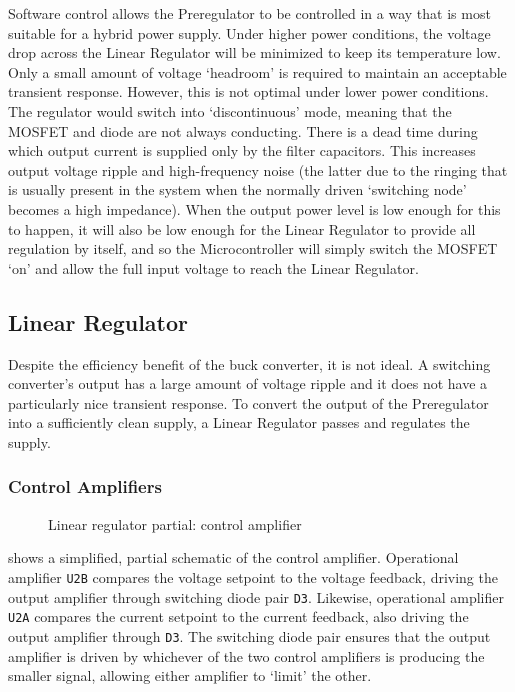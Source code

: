 \documentclass[a4paper,twocolumn,10pt,openany,oneside,final,fleqn]{memoir}
\newcommand{\rd}[1]{\texttt{#1}}
\newcommand{\xcircuit}[1]{ \centering \textsf{  } }
\begin{document}
Software control allows the Preregulator to be controlled in a way that is most suitable
for a hybrid power supply. Under higher power conditions, the voltage drop across the Linear
Regulator will be minimized to keep its temperature low. Only a small amount of voltage
`headroom' is required to maintain an acceptable transient response. However, this is not
optimal under lower power conditions. The regulator would switch into `discontinuous' mode,
meaning that the MOSFET and diode are not always conducting. There is a dead time during
which output current is supplied only by the filter capacitors. This increases output voltage
ripple and high-frequency noise (the latter due to the ringing that is usually present in
the system when the normally driven `switching node' becomes a high impedance). When the
output power level is low enough for this to happen, it will also be low enough for the
Linear Regulator to provide all regulation by itself, and so the Microcontroller will
simply switch the MOSFET `on' and allow the full input voltage to reach the Linear Regulator.

\subsection{Linear Regulator}

Despite the efficiency benefit of the buck converter, it is not ideal. A switching converter's
output has a large amount of voltage ripple and it does not have a particularly nice transient
response. To convert the output of the Preregulator into a sufficiently clean supply, a Linear
Regulator passes and regulates the supply.

\subsubsection{Control Amplifiers}

\begin{figure}
\xcircuit{control358}
\caption{Linear regulator partial: control amplifier}
\label{fig:controlamp}
\end{figure}

 shows a simplified, partial schematic of the control amplifier.
Operational amplifier \rd{U2B} compares the voltage setpoint to the voltage feedback,
driving the output amplifier through switching diode pair \rd{D3}. Likewise, operational
amplifier \rd{U2A} compares the current setpoint to the current feedback, also driving
the output amplifier through \rd{D3}. The switching diode pair ensures that the output
amplifier is driven by whichever of the two control amplifiers is producing the smaller
signal, allowing either amplifier to `limit' the other.
\end{document}

